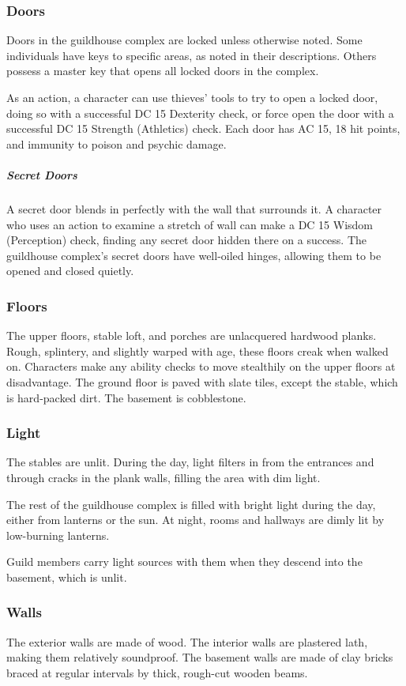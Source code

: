 \documentclass[10pt,a4paper,twoside,bg=print,twocolumn,openany,nodeprecatedcode]{dndbook}
\begin{document}
\subsubsection{Doors}
Doors in the guildhouse complex are locked unless otherwise noted. Some individuals have keys to specific areas, as noted in their descriptions. Others possess a master key that opens all locked doors in the complex.

As an action, a character can use thieves' tools to try to open a locked door, doing so with a successful DC 15 Dexterity check, or force open the door with a successful DC 15 Strength (Athletics) check. Each door has AC 15, 18 hit points, and immunity to poison and psychic damage.

\subparagraph{Secret Doors}
A secret door blends in perfectly with the wall that surrounds it. A character who uses an action to examine a stretch of wall can make a DC 15 Wisdom (Perception) check, finding any secret door hidden there on a success. The guildhouse complex's secret doors have well-oiled hinges, allowing them to be opened and closed quietly.

\subsubsection{Floors}
The upper floors, stable loft, and porches are unlacquered hardwood planks. Rough, splintery, and slightly warped with age, these floors creak when walked on. Characters make any ability checks to move stealthily on the upper floors at disadvantage. The ground floor is paved with slate tiles, except the stable, which is hard-packed dirt. The basement is cobblestone.

\subsubsection{Light}
The stables are unlit. During the day, light filters in from the entrances and through cracks in the plank walls, filling the area with dim light.

The rest of the guildhouse complex is filled with bright light during the day, either from lanterns or the sun. At night, rooms and hallways are dimly lit by low-burning lanterns.

Guild members carry light sources with them when they descend into the basement, which is unlit.

\subsubsection{Walls}
The exterior walls are made of wood. The interior walls are plastered lath, making them relatively soundproof. The basement walls are made of clay bricks braced at regular intervals by thick, rough-cut wooden beams.
\end{document}
